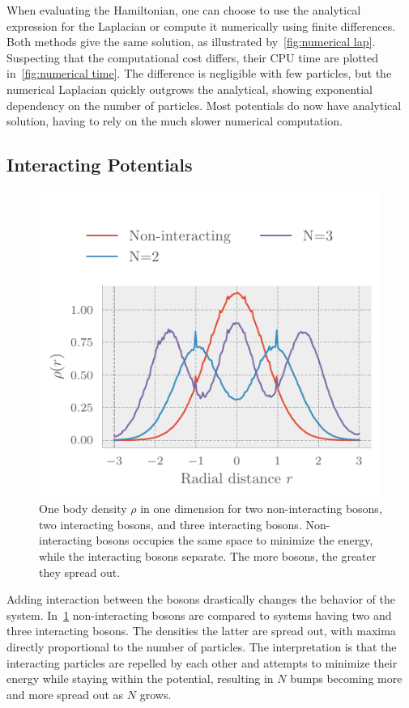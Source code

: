 When evaluating the Hamiltonian, one can choose to use the analytical expression
for the Laplacian or compute it numerically using finite differences. Both
methods give the same solution, as illustrated by~\cref{fig:numerical lap}.
Suspecting that the computational cost differs, their CPU time are plotted
in~\cref{fig:numerical time}. The difference is negligible with few particles,
but the numerical Laplacian quickly outgrows the analytical, showing exponential
dependency on the number of particles. Most potentials do now have analytical
solution, having to rely on the much slower numerical computation. 

\subsection{Interacting Potentials}
\begin{figure}[ht]
	\includegraphics[]{figures/interactingDensity.pdf}
	\centering
	\caption{One body density \(\rho\) in one dimension for two non-interacting
      bosons, two interacting bosons, and three interacting bosons.
      Non-interacting bosons occupies the same space to minimize the energy,
      while the interacting bosons separate. The more bosons, the greater they
      spread out.}
	\label{fig:interacting density}
\end{figure}

Adding interaction between the bosons drastically changes the behavior of the
system. In~\cref{fig:interacting density} non-interacting bosons are compared to
systems having two and three interacting bosons. The densities the latter are
spread out, with maxima directly proportional to the number of particles. The
interpretation is that the interacting particles are repelled by each other and
attempts to minimize their energy while staying within the potential, resulting
in \(N\) bumps becoming more and more spread out as \(N\) grows.


